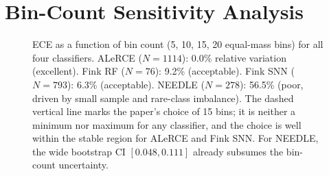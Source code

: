 \documentclass[twocolumn]{aastex631}
\begin{document}
\section{Bin-Count Sensitivity Analysis} \label{app:bins}

\begin{figure}
\caption{ECE as a function of bin count (5, 10, 15, 20 equal-mass bins) for all four classifiers. ALeRCE ($N = 1114$): 0.0\% relative variation (excellent). Fink RF ($N = 76$): 9.2\% (acceptable). Fink SNN ($N = 793$): 6.3\% (acceptable). NEEDLE ($N = 278$): 56.5\% (poor, driven by small sample and rare-class imbalance). The dashed vertical line marks the paper's choice of 15 bins; it is neither a minimum nor maximum for any classifier, and the choice is well within the stable region for ALeRCE and Fink SNN. For NEEDLE, the wide bootstrap CI $[0.048, 0.111]$ already subsumes the bin-count uncertainty. \label{fig:bins}}
\end{figure}
\end{document}
